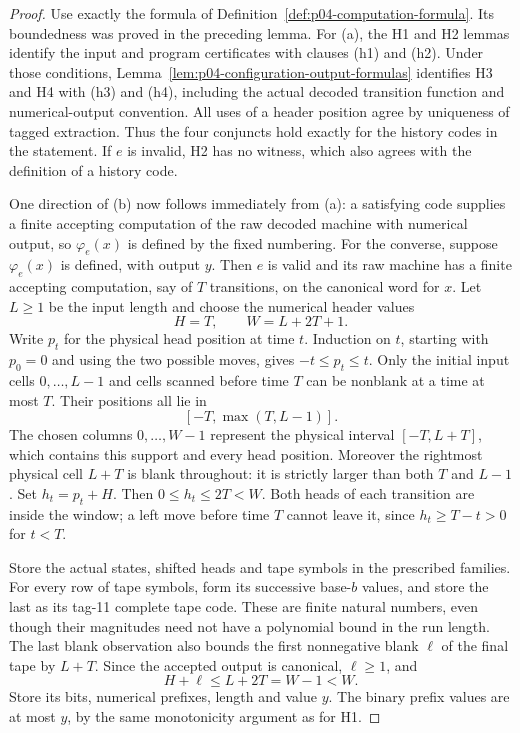 \begin{proof}
Use exactly the formula of Definition~\ref{def:p04-computation-formula}.
Its boundedness was proved in the preceding lemma.  For (a), the H1
and H2 lemmas identify the input and program certificates with clauses
(h1) and (h2).  Under those conditions,
Lemma~\ref{lem:p04-configuration-output-formulas} identifies H3 and
H4 with (h3) and (h4), including the actual decoded transition
function and numerical-output convention.  All uses of a header
position agree by uniqueness of tagged extraction.  Thus the four
conjuncts hold exactly for the history codes in the statement.
If \(e\) is invalid, H2 has no witness, which also agrees with
the definition of a history code.

One direction of (b) now follows immediately from (a): a satisfying
code supplies a finite accepting computation of the raw decoded
machine with numerical output, so \(\varphi_e(x)\) is defined by
the fixed numbering.  For the converse, suppose \(\varphi_e(x)\)
is defined, with output \(y\).  Then \(e\) is valid and its raw
machine has a finite accepting computation, say of \(T\) transitions,
on the canonical word for \(x\).  Let \(L\geq1\) be the input length
and choose the numerical header values
\[
 H=T,\qquad W=L+2T+1.
\]
Write \(p_t\) for the physical head position at time \(t\).
Induction on \(t\), starting with \(p_0=0\) and using the two
possible moves, gives \(-t\leq p_t\leq t\).
Only the initial input cells \(0,\ldots,L-1\) and cells scanned
before time \(T\) can be nonblank at a time at most \(T\).
Their positions all lie in
\[
 [-T,\max(T,L-1)].
\]
The chosen columns \(0,\ldots,W-1\) represent the physical
interval \([-T,L+T]\), which contains this support and every
head position.  Moreover the rightmost physical cell \(L+T\)
is blank throughout: it is strictly larger than both \(T\)
and \(L-1\).  Set \(h_t=p_t+H\).  Then
\(0\leq h_t\leq2T<W\).  Both heads of each transition are
inside the window; a left move before time \(T\) cannot leave
it, since \(h_t\geq T-t>0\) for \(t<T\).

Store the actual states, shifted heads and tape symbols in the
prescribed families.  For every row of tape symbols, form its
successive base-\(b\) values, and store the last as its tag-11
complete tape code.  These are finite natural numbers, even
though their magnitudes need not have a polynomial bound in the
run length.  The last blank observation also bounds the first
nonnegative blank \(\ell\) of the final tape by \(L+T\).
Since the accepted output is canonical, \(\ell\geq1\), and
\[
 H+\ell\leq L+2T=W-1<W.
\]
Store its bits, numerical prefixes, length and value \(y\).
The binary prefix values are at most \(y\), by the same
monotonicity argument as for H1.


\end{proof}
